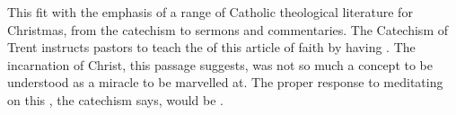 
This fit with the emphasis of a range of Catholic theological literature for
Christmas, from the catechism to sermons and commentaries.
The Catechism of Trent instructs pastors to teach the 
of this article of faith by having .%
    \Autocite[50]{Catholic:Catechismus1614}
The incarnation of Christ, this passage suggests, was not so much a concept to
be understood as a miracle to be marvelled at.
The proper response to meditating on this , the
catechism says, would be .%
    \Autocite[50]{Catholic:Catechismus1614}


